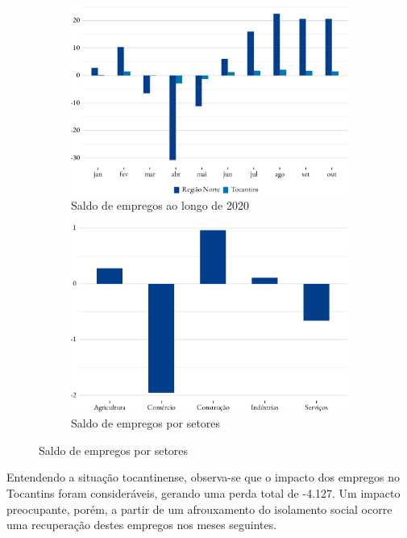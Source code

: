 \begin{figure}[!h]
	\begin{subfigure}{\linewidth}
		\caption{Saldo de empregos ao longo de 2020}
		\label{fig:empregos}
		\includegraphics{fig/saldo-1.pdf}
	\end{subfigure}
	\begin{subfigure}{\linewidth}
		\caption{Saldo de empregos por setores}
		\label{fig:setores}
		\includegraphics{fig/saldo_setor_to-1.pdf}
	\end{subfigure}
\end{figure}

\par Entendendo a situação tocantinense, observa-se que o impacto dos empregos no Tocantins foram consideráveis, gerando uma perda total de -4.127. Um impacto preocupante, porém, a partir de um afrouxamento do isolamento social ocorre uma recuperação destes empregos nos meses seguintes.

